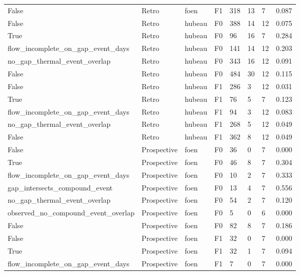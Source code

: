 {\begin{longtable}{p{}p{}p{}p{}p{}p{}p{}p{}}
False & Retro & foen & F1 & 318 & 13 & 7 & 0.087 \\
False & Retro & hubeau & F0 & 388 & 14 & 12 & 0.075 \\
True & Retro & hubeau & F0 & 96 & 16 & 7 & 0.284 \\
flow\_\allowbreak incomplete\_\allowbreak on\_\allowbreak gap\_\allowbreak event\_\allowbreak days & Retro & hubeau & F0 & 141 & 14 & 12 & 0.203 \\
no\_\allowbreak gap\_\allowbreak thermal\_\allowbreak event\_\allowbreak overlap & Retro & hubeau & F0 & 343 & 16 & 12 & 0.091 \\
False & Retro & hubeau & F0 & 484 & 30 & 12 & 0.115 \\
False & Retro & hubeau & F1 & 286 & 3 & 12 & 0.031 \\
True & Retro & hubeau & F1 & 76 & 5 & 7 & 0.123 \\
flow\_\allowbreak incomplete\_\allowbreak on\_\allowbreak gap\_\allowbreak event\_\allowbreak days & Retro & hubeau & F1 & 94 & 3 & 12 & 0.083 \\
no\_\allowbreak gap\_\allowbreak thermal\_\allowbreak event\_\allowbreak overlap & Retro & hubeau & F1 & 268 & 5 & 12 & 0.049 \\
False & Retro & hubeau & F1 & 362 & 8 & 12 & 0.049 \\
False & Prospective & foen & F0 & 36 & 0 & 7 & 0.000 \\
True & Prospective & foen & F0 & 46 & 8 & 7 & 0.304 \\
flow\_\allowbreak incomplete\_\allowbreak on\_\allowbreak gap\_\allowbreak event\_\allowbreak days & Prospective & foen & F0 & 10 & 2 & 7 & 0.333 \\
gap\_\allowbreak intersects\_\allowbreak compound\_\allowbreak event & Prospective & foen & F0 & 13 & 4 & 7 & 0.556 \\
no\_\allowbreak gap\_\allowbreak thermal\_\allowbreak event\_\allowbreak overlap & Prospective & foen & F0 & 54 & 2 & 7 & 0.120 \\
observed\_\allowbreak no\_\allowbreak compound\_\allowbreak event\_\allowbreak overlap & Prospective & foen & F0 & 5 & 0 & 6 & 0.000 \\
False & Prospective & foen & F0 & 82 & 8 & 7 & 0.186 \\
False & Prospective & foen & F1 & 32 & 0 & 7 & 0.000 \\
True & Prospective & foen & F1 & 32 & 1 & 7 & 0.094 \\
flow\_\allowbreak incomplete\_\allowbreak on\_\allowbreak gap\_\allowbreak event\_\allowbreak days & Prospective & foen & F1 & 7 & 0 & 7 & 0.000 \\

\end{longtable}}
